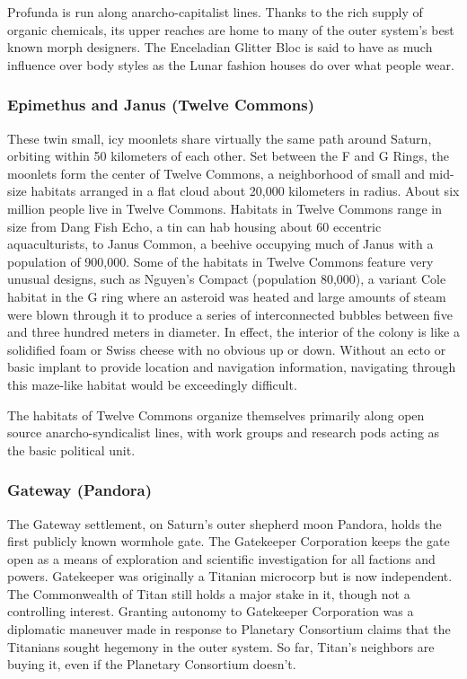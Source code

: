 Profunda is run along anarcho-capitalist lines. Thanks to the rich supply of organic chemicals, its upper reaches are home to many of the outer system’s best known morph designers. The Enceladian Glitter Bloc is said to have as much influence over body styles as the Lunar fashion houses do over what people wear. 

\subsubsection{Epimethus and Janus (Twelve Commons)} \label{sec:epim-janus-twelve} 

These twin small, icy moonlets share virtually the same path around Saturn, orbiting within 50 kilometers of each other. Set between the F and G Rings, the moonlets form the center of Twelve Commons, a neighborhood of small and mid-size habitats arranged in a flat cloud about 20,000 kilometers in radius. About six million people live in Twelve Commons. Habitats in Twelve Commons range in size from Dang Fish Echo, a tin can hab housing about 60 eccentric aquaculturists, to Janus Common, a beehive occupying much of Janus with a population of 900,000. Some of the habitats in Twelve Commons feature very unusual designs, such as Nguyen’s Compact (population 80,000), a variant Cole habitat in the G ring where an asteroid was heated and large amounts of steam were blown through it to produce a series of interconnected bubbles between five and three hundred meters in diameter. In effect, the interior of the colony is like a solidified foam or Swiss cheese with no obvious up or down. Without an ecto or basic implant to provide location and navigation information, navigating through this maze-like habitat would be exceedingly difficult. 

The habitats of Twelve Commons organize themselves primarily along open source anarcho-syndicalist lines, with work groups and research pods acting as the basic political unit. 

\subsubsection{Gateway (Pandora)} \label{sec:gateway-pandora} 

The Gateway settlement, on Saturn's outer shepherd moon Pandora, holds the first publicly known wormhole gate. The Gatekeeper Corporation keeps the gate open as a means of exploration and scientific investigation for all factions and powers. Gatekeeper was originally a Titanian microcorp but is now independent. The Commonwealth of Titan still holds a major stake in it, though not a controlling interest. Granting autonomy to Gatekeeper Corporation was a diplomatic maneuver made in response to Planetary Consortium claims that the Titanians sought hegemony in the outer system. So far, Titan's neighbors are buying it, even if the Planetary Consortium doesn't. 


